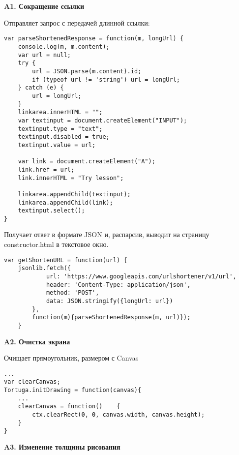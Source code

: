 \appendix
\chapter{} 

\textbf{\Large A1. Сокращение ссылки} \label{AppendixA3}
\vspace{6mm}

Отправляет запрос с передачей длинной ссылки:
\begin{verbatim}
var parseShortenedResponse = function(m, longUrl) {
    console.log(m, m.content);
    var url = null;
    try {                
        url = JSON.parse(m.content).id;
        if (typeof url != 'string') url = longUrl;
    } catch (e) {
        url = longUrl;
    }
	linkarea.innerHTML = "";			
	var textinput = document.createElement("INPUT");
	textinput.type = "text";
	textinput.disabled = true;
	textinput.value = url;

	var link = document.createElement("A");
	link.href = url;
	link.innerHTML = "Try lesson";

	linkarea.appendChild(textinput);
	linkarea.appendChild(link);
	textinput.select();
}

\end{verbatim}

Получает ответ в формате JSON и, распарсив, выводит на страницу  constructor.html в текстовое окно.
\begin{verbatim}
var getShortenURL = function(url) {
    jsonlib.fetch({
            url: 'https://www.googleapis.com/urlshortener/v1/url',
            header: 'Content-Type: application/json',
            method: 'POST',
            data: JSON.stringify({longUrl: url})
        }, 
        function(m){parseShortenedResponse(m, url)});
    }
\end{verbatim}

\vspace{16mm}
\textbf{\Large A2. Очистка экрана}
\vspace{6mm}

Очищает прямоугольник, размером с Canvas 
\begin{verbatim}
...
var clearCanvas;
Tortuga.initDrawing = function(canvas){
	...
    clearCanvas = function()	{
        ctx.clearRect(0, 0, canvas.width, canvas.height);
    }
}
\end{verbatim}

\vspace{16mm}
\textbf{\Large A3. Изменение толщины рисования}
\vspace{6mm}

